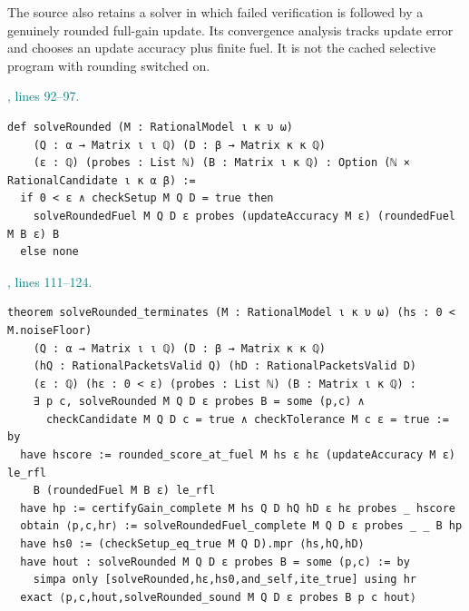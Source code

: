 \documentclass[11pt]{article}\usepackage{needspace}\renewcommand{\paperkind}{Lean companion}\setlength{\parskip}{0.35em}
\begin{document}
The source also retains a solver in which failed verification is followed by a genuinely rounded full-gain update. Its convergence analysis tracks update error and chooses an update accuracy plus finite fuel. It is not the cached selective program with rounding switched on.



{\small\textcolor{teal}{, lines 92--97.}\par}

\begin{lstlisting}[style=BayesSource]
def solveRounded (M : RationalModel ι κ υ ω)
    (Q : α → Matrix ι ι ℚ) (D : β → Matrix κ κ ℚ)
    (ε : ℚ) (probes : List ℕ) (B : Matrix ι κ ℚ) : Option (ℕ × RationalCandidate ι κ α β) :=
  if 0 < ε ∧ checkSetup M Q D = true then
    solveRoundedFuel M Q D ε probes (updateAccuracy M ε) (roundedFuel M B ε) B
  else none
\end{lstlisting}



{\small\textcolor{teal}{, lines 111--124.}\par}

\begin{lstlisting}[style=BayesSource]
theorem solveRounded_terminates (M : RationalModel ι κ υ ω) (hs : 0 < M.noiseFloor)
    (Q : α → Matrix ι ι ℚ) (D : β → Matrix κ κ ℚ)
    (hQ : RationalPacketsValid Q) (hD : RationalPacketsValid D)
    (ε : ℚ) (hε : 0 < ε) (probes : List ℕ) (B : Matrix ι κ ℚ) :
    ∃ p c, solveRounded M Q D ε probes B = some (p,c) ∧
      checkCandidate M Q D c = true ∧ checkTolerance M c ε = true := by
  have hscore := rounded_score_at_fuel M hs ε hε (updateAccuracy M ε) le_rfl
    B (roundedFuel M B ε) le_rfl
  have hp := certifyGain_complete M hs Q D hQ hD ε hε probes _ hscore
  obtain ⟨p,c,hr⟩ := solveRoundedFuel_complete M Q D ε probes _ _ B hp
  have hs0 := (checkSetup_eq_true M Q D).mpr ⟨hs,hQ,hD⟩
  have hout : solveRounded M Q D ε probes B = some (p,c) := by
    simpa only [solveRounded,hε,hs0,and_self,ite_true] using hr
  exact ⟨p,c,hout,solveRounded_sound M Q D ε probes B p c hout⟩
\end{lstlisting}
\end{document}
